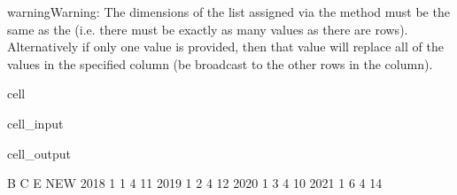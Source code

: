 \documentclass[letterpaper,10pt,english]{jupyterBook}
\begin{document}
\begin{sphinxadmonition}{warning}{Warning:}
\sphinxAtStartPar
The dimensions of the list assigned via the \sphinxcode{\sphinxupquote{=}} method must be the same as the  (i.e. there must be exactly as many values as there are rows).  Alternatively if only one value is provided, then that value will replace all of the values in the specified column (be broadcast to the other rows in the column).
\end{sphinxadmonition}

\begin{sphinxuseclass}{cell}\begin{sphinxVerbatimInput}

\begin{sphinxuseclass}{cell_input}
\begin{sphinxVerbatim}[commandchars=\\\{\}]
\PYG{p}{[}\PYG{p}{]}\PYG{p}{[}\PYG{p}{]}

\end{sphinxVerbatim}

\end{sphinxuseclass}\end{sphinxVerbatimInput}
\begin{sphinxVerbatimOutput}

\begin{sphinxuseclass}{cell_output}
\begin{sphinxVerbatim}[commandchars=\\\{\}]
      B  C  E  NEW
2018  1  1  4   11
2019  1  2  4   12
2020  1  3  4   10
2021  1  6  4   14
\end{sphinxVerbatim}

\end{sphinxuseclass}\end{sphinxVerbatimOutput}

\end{sphinxuseclass}
\end{document}
